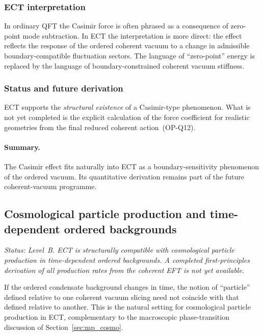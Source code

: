 \subsubsection*{ECT interpretation}

In ordinary QFT the Casimir force is often phrased as a consequence of
zero-point mode subtraction.
In ECT the interpretation is more direct: the effect reflects the
response of the ordered coherent vacuum to a change in admissible
boundary-compatible fluctuation sectors.
The language of ``zero-point'' energy is replaced by the language of
boundary-constrained coherent vacuum stiffness.

\subsubsection*{Status and future derivation}

ECT supports the \emph{structural existence} of a Casimir-type
phenomenon.
What is not yet completed is the explicit calculation of the force
coefficient for realistic geometries from the final reduced coherent
action~(OP-Q12).

\paragraph{Summary.}
The Casimir effect fits naturally into ECT as a boundary-sensitivity
phenomenon of the ordered vacuum.
Its quantitative derivation remains part of the future
coherent-vacuum programme.

\subsection{Cosmological particle production and time-dependent ordered backgrounds}
\label{sec:qs_particle_production}

\textit{Status: Level~B.
ECT is structurally compatible with cosmological particle production
in time-dependent ordered backgrounds.
A completed first-principles derivation of all production rates from
the coherent EFT is not yet available.}

\medskip
If the ordered condensate background changes in time, the notion of
``particle'' defined relative to one coherent vacuum slicing need not
coincide with that defined relative to another.
This is the natural setting for cosmological particle production in ECT,
complementary to the macroscopic phase-transition discussion
of Section~\ref{sec:mp_cosmo}.

